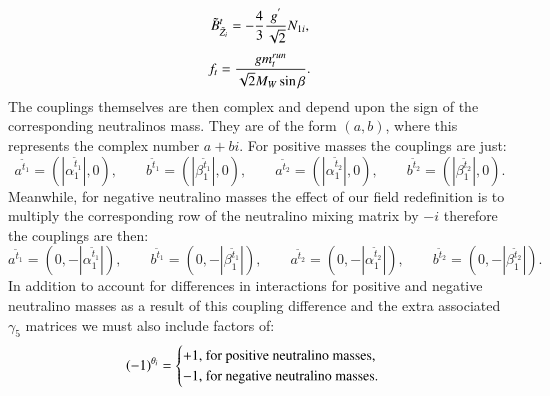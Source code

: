 \documentclass[final,3p,times,pdflatex]{elsarticle}
\begin{document}
\begin{equation}
\tilde{B}^{t}_{\tilde{Z}_i} = -{4 \over 3}{g^{'} \over \sqrt{2}}N_{1i},
\end{equation}
\begin{equation}
f_{t} = {g m_{t}^{run} \over \sqrt{2} M_{W} \sin\beta}.
\end{equation}
The couplings themselves are then complex and depend upon the sign of the corresponding neutralinos mass. They are of the form $(a,b)$, where this represents the complex number $a+bi$.
For positive masses the couplings are just:
\begin{equation}
a^{\tilde{t}_1} = (|\alpha_{1}^{\tilde{t}_1}|,0) , \quad \quad b^{\tilde{t}_1} = (|\beta_{1}^{\tilde{t}_1}|,0), \quad \quad a^{\tilde{t}_2} = (|\alpha_{1}^{\tilde{t}_2}|,0), \quad \quad b^{\tilde{t}_2} = (|\beta_{1}^{\tilde{t}_2}|,0).
\end{equation}
Meanwhile, for negative neutralino masses the effect of our field redefinition is to multiply the corresponding row of the neutralino mixing matrix by $-i$ therefore the couplings are then:
\begin{equation}
a^{\tilde{t}_1} = (0,-|\alpha_{1}^{\tilde{t}_1}|), \quad \quad b^{\tilde{t}_1} = (0,-|\beta_{1}^{\tilde{t}_1}|), \quad \quad a^{\tilde{t}_2} = (0,-|\alpha_{1}^{\tilde{t}_2}|), \quad \quad b^{\tilde{t}_2} = (0,-|\beta_{1}^{\tilde{t}_2}|).
\end{equation}
In addition to account for differences in interactions for positive and negative neutralino masses as a result of this  coupling difference and the extra associated $\gamma_{5}$ matrices we must also include factors of:
\begin{equation}
(-1)^{\theta_i} = \begin{cases}  +1, $ for positive neutralino masses,$ \\
								 -1, $ for negative neutralino masses$. \\
						\end{cases}
\end{equation}
\end{document}
